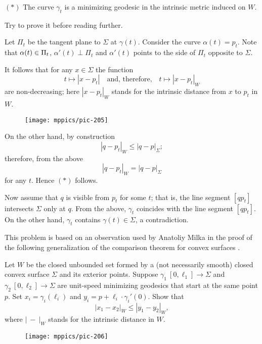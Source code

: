 \begin{cl}{$({*})$} The curve $\gamma_t$ is a minimizing geodesic in the intrinsic metric induced on $W$.
\end{cl}


Try to prove it before reading further.

\medskip

Let $\Pi_t$ be the tangent plane to $\Sigma$ at $\gamma(t)$.
Consider the curve $\alpha(t)=p_t$.
Note that  
$\alpha(t)\z\in\Pi_t$,
$\alpha'(t)\perp\Pi_t$
and $\alpha'(t)$ points to the side of $\Pi_t$ opposite to $\Sigma$.



It follows that for any $x\in\Sigma$ the function  
\[t\mapsto |x - p_t|
\quad\text{and, therefore,}\quad
t\mapsto |x - p_t|_W\] are non-decreasing;
here $|x - p_t|_W$ stands for the intrinsic distance from $x$ to $p_t$ in $W$.


\begin{wrapfigure}{r}{43 mm}
\vskip-6mm
\centering
\texttt{[image: mppics/pic-205]}
\end{wrapfigure}

On the other hand, by construction 
\[|q - p_t|_W\le |q - p|_\Sigma;\] 
therefore, from the above 
\[|q - p_t|_W= |q - p|_\Sigma\]
for any $t$.
Hence $(*)$ follows.

Now assume that $q$ is visible from $p_t$ for some $t$;
that is, the line segment $[qp_t]$ intersects $\Sigma$ only at $q$.
From the above, 
$\gamma_t$  coincides with the line segment $[qp_t]$.
On the other hand, $\gamma_t$ contains $\gamma(t)\in\Sigma$, a contradiction.\qeds

This problem is based on an observation used by Anatoliy Milka in the proof of the following generalization of the comparison theorem for convex surfaces \cite[Theorem 2]{milka-geod}.

\begin{pr}
Let $W$ be the closed unbounded set formed by a (not necessarily smooth) closed convex surface $\Sigma$ and its exterior points.
Suppose $\gamma_1\:[0,\ell_1]\to \Sigma$ and $\gamma_2\:[0,\ell_2]\to \Sigma$ are unit-speed minimizing geodesics that start at the same point $p$.
Set $x_i=\gamma_i(\ell_i)$ and $y_i=p+\ell_i\cdot\gamma_i'(0)$.
Show that 
\[|x_1-x_2|_W\le |y_1-y_2|_W,\]
where $|\  - \ |_W$ stands for the intrinsic distance in $W$.
\end{pr}



\begin{wrapfigure}{r}{43 mm}
\vskip-0mm
\centering
\texttt{[image: mppics/pic-206]}
\end{wrapfigure}

